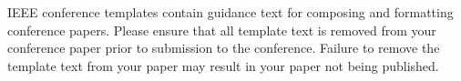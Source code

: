 \documentclass[conference]{IEEEtran}
\begin{document}
\begin{thebibliography}{00}
\end{thebibliography}
\vspace{12pt}
\color{red}
IEEE conference templates contain guidance text for composing and formatting conference papers. Please ensure that all template text is removed from your conference paper prior to submission to the conference. Failure to remove the template text from your paper may result in your paper not being published.
\end{document}
